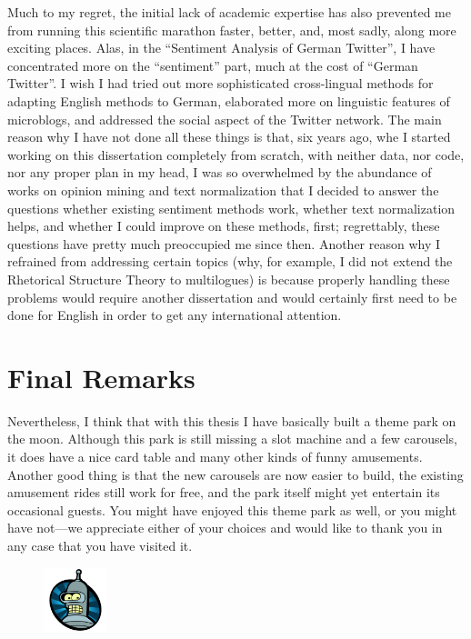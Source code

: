 Much to my regret, the initial lack of academic expertise has also
prevented me from running this scientific marathon faster, better,
and, most sadly, along more exciting places.  Alas, in the ``Sentiment
Analysis of German Twitter'', I have concentrated more on the
``sentiment'' part, much at the cost of ``German Twitter''.  I wish I
had tried out more sophisticated cross-lingual methods for adapting
English methods to German, elaborated more on linguistic features of
microblogs, and addressed the social aspect of the Twitter network.
The main reason why I have not done all these things is that, six
years ago, whe I started working on this dissertation completely from
scratch, with neither data, nor code, nor any proper plan in my head,
I was so overwhelmed by the abundance of works on opinion mining and
text normalization that I decided to answer the questions whether
existing sentiment methods work, whether text normalization helps, and
whether I could improve on these methods, first; regrettably, these
questions have pretty much preoccupied me since then.  Another reason
why I refrained from addressing certain topics (why, for example, I
did not extend the Rhetorical Structure Theory to multilogues) is
because properly handling these problems would require another
dissertation and would certainly first need to be done for English in
order to get any international attention.


\section*{Final Remarks}

Nevertheless, I think that with this thesis I have basically built a
theme park on the moon.  Although this park is still missing a slot
machine and a few carousels, it does have a nice card table and many
other kinds of funny amusements.  Another good thing is that the new
carousels are now easier to build, the existing amusement rides still
work for free, and the park itself might yet entertain its occasional
guests.  You might have enjoyed this theme park as well, or you might
have not---we appreciate either of your choices and would like to
thank you in any case that you have visited it.
\begin{figure}[htb]
  \centering \includegraphics[height=5em]{img/bender.png}
\end{figure}
